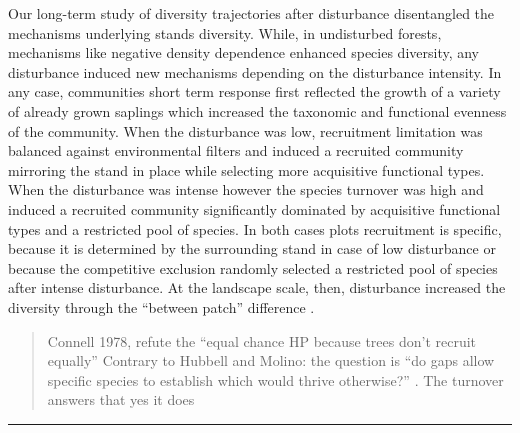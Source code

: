 \documentclass[fleqn,10pt]{ArtEcoFoG} %
\begin{document}
Our long-term study of diversity trajectories after disturbance
disentangled the mechanisms underlying stands diversity. While, in
undisturbed forests, mechanisms like negative density dependence
enhanced species diversity, any disturbance induced new mechanisms
depending on the disturbance intensity. In any case, communities short
term response first reflected the growth of a variety of already grown
saplings which increased the taxonomic and functional evenness of the
community. When the disturbance was low, recruitment limitation was
balanced against environmental filters and induced a recruited community
mirroring the stand in place while selecting more acquisitive functional
types. When the disturbance was intense however the species turnover was
high and induced a recruited community significantly dominated by
acquisitive functional types and a restricted pool of species. In both
cases plots recruitment is specific, because it is determined by the
surrounding stand in case of low disturbance or because the competitive
exclusion randomly selected a restricted pool of species after intense
disturbance. At the landscape scale, then, disturbance increased the
diversity through the ``between patch'' difference
\citep{Denslow1987, Chesson2000, Sheil2003}.

\begin{quote}
Connell 1978, refute the ``equal chance HP because trees don't recruit
equally'' Contrary to Hubbell and Molino: the question is ``do gaps
allow specific species to establish which would thrive otherwise?''
\citep{Sheil2003}. The turnover answers that yes it does
\end{quote}

\begin{center}\rule{0.5\linewidth}{\linethickness}\end{center}



\makeatletter

\makeatother


\end{document}

